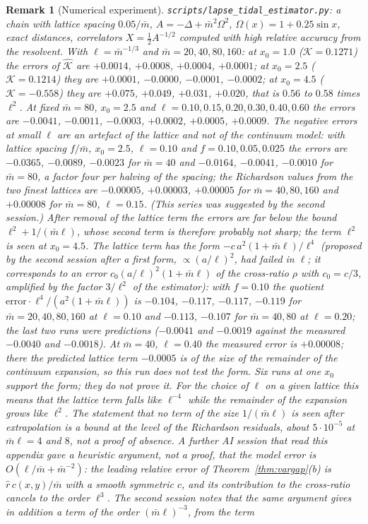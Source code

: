 \documentclass[11pt,a4paper]{article}
\theoremstyle{stmt}
\theoremstyle{defn}
\theoremstyle{rmk}
\newtheorem{remark}[theorem]{Remark}
\numberwithin{equation}{section}
\begin{document}
{\begin{remark}[Numerical experiment]
\texttt{scripts/lapse\_tidal\_estimator.py}: a chain with lattice spacing $0.05/\bar m$, $A=-\Delta+\bar m^2\Omega^2$, $\Omega(x)=1+0.25\sin x$, exact distances, correlators $X=\tfrac12A^{-1/2}$ computed with high relative accuracy from the resolvent. With $\ell=\bar m^{-1/3}$ and $\bar m=20,40,80,160$: at $x_0=1.0$ ($\mathcal K=0.1271$) the errors of $\hat{\mathcal K}$ are $+0.0014$, $+0.0008$, $+0.0004$, $+0.0001$; at $x_0=2.5$ ($\mathcal K=0.1214$) they are $+0.0001$, $-0.0000$, $-0.0001$, $-0.0002$; at $x_0=4.5$ ($\mathcal K=-0.558$) they are $+0.075$, $+0.049$, $+0.031$, $+0.020$, that is $0.56$ to $0.58$ times $\ell^2$. At fixed $\bar m=80$, $x_0=2.5$ and $\ell=0.10,0.15,0.20,0.30,0.40,0.60$ the errors are $-0.0041$, $-0.0011$, $-0.0003$, $+0.0002$, $+0.0005$, $+0.0009$. The negative errors at small $\ell$ are an artefact of the lattice and not of the continuum model: with lattice spacing $f/\bar m$, $x_0=2.5$, $\ell=0.10$ and $f=0.10,0.05,0.025$ the errors are $-0.0365$, $-0.0089$, $-0.0023$ for $\bar m=40$ and $-0.0164$, $-0.0041$, $-0.0010$ for $\bar m=80$, a factor four per halving of the spacing; the Richardson values from the two finest lattices are $-0.00005$, $+0.00003$, $+0.00005$ for $\bar m=40,80,160$ and $+0.00008$ for $\bar m=80$, $\ell=0.15$. (This series was suggested by the second session.) After removal of the lattice term the errors are far below the bound $\ell^2+1/(\bar m\ell)$, whose second term is therefore probably not sharp; the term $\ell^2$ is seen at $x_0=4.5$. The lattice term has the form $-c\,a^2(1+\bar m\ell)/\ell^4$ (proposed by the second session after a first form, $\propto(a/\ell)^2$, had failed in $\ell$; it corresponds to an error $c_0(a/\ell)^2(1+\bar m\ell)$ of the cross-ratio $\rho$ with $c_0=c/3$, amplified by the factor $3/\ell^2$ of the estimator): with $f=0.10$ the quotient $\text{error}\cdot\ell^4/(a^2(1+\bar m\ell))$ is $-0.104$, $-0.117$, $-0.117$, $-0.119$ for $\bar m=20,40,80,160$ at $\ell=0.10$ and $-0.113$, $-0.107$ for $\bar m=40,80$ at $\ell=0.20$; the last two runs were predictions ($-0.0041$ and $-0.0019$ against the measured $-0.0040$ and $-0.0018$). At $\bar m=40$, $\ell=0.40$ the measured error is $+0.00008$; there the predicted lattice term $-0.0005$ is of the size of the remainder of the continuum expansion, so this run does not test the form. Six runs at one $x_0$ support the form; they do not prove it. For the choice of $\ell$ on a given lattice this means that the lattice term falls like $\ell^{-4}$ while the remainder of the expansion grows like $\ell^2$. The statement that no term of the size $1/(\bar m\ell)$ is seen after extrapolation is a bound at the level of the Richardson residuals, about $5\cdot10^{-5}$ at $\bar m\ell=4$ and $8$, not a proof of absence. A further AI session that read this appendix gave a heuristic argument, not a proof, that the model error is $O(\ell/\bar m+\bar m^{-2})$: the leading relative error of Theorem~\ref{thm:vargap}(b) is $\hat r\,c(x,y)/\bar m$ with a smooth symmetric $c$, and its contribution to the cross-ratio cancels to the order $\ell^3$. The second session notes that the same argument gives in addition a term of the order $(\bar m\ell)^{-3}$, from the term 
\end{remark}}
\end{document}

